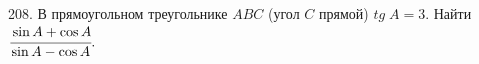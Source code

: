 208. В прямоугольном треугольнике $ABC$ (угол $C$ прямой) $tg\; A=3.$ Найти $\cfrac{\sin A +\cos A}{\sin A - \cos A}.$\\
